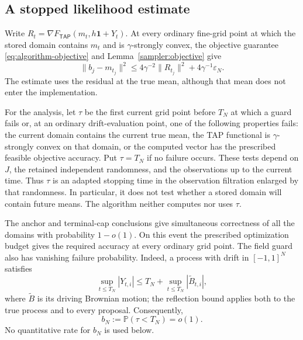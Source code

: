 \documentclass[11pt,reqno]{amsart}
\def\tap{{\mathsf{TAP}}}
\begin{document}
\subsection{A stopped likelihood estimate}

Write $R_t=\nabla F_{\tap}(m_t,h\mathbf1+Y_t)$. At every ordinary
fine-grid point at which the stored domain contains $m_t$ and is
$\gamma$-strongly convex, the objective guarantee
\eqref{eq:algorithm-objective} and Lemma~\ref{sampler:objective} give
\begin{equation}\label{eq:completion-drift-error}
 \|b_j-m_{t_j}\|^2
    \le4\gamma^{-2}\|R_{t_j}\|^2
                   +4\gamma^{-1}\varepsilon_N.
\end{equation}
The estimate uses the residual at the true mean, although that mean
does not enter the implementation.

For the analysis, let $\tau$ be the first current grid point before
$T_N$ at which a guard fails or, at an ordinary drift-evaluation point,
one of the following properties fails: the current domain contains the
current true mean, the TAP functional is $\gamma$-strongly convex on
that domain, or the computed vector has the prescribed feasible
objective accuracy. Put $\tau=T_N$ if no failure occurs. These tests
depend on $J$, the retained independent randomness, and the observations
up to the current time. Thus $\tau$ is an adapted stopping time in the
observation filtration enlarged by that randomness. In particular, it
does not test whether a stored domain will contain future means.
The algorithm neither computes nor uses $\tau$.

The anchor and terminal-cap conclusions give simultaneous correctness
of all the domains with probability $1-o(1)$. On this event the
prescribed optimization budget gives the required accuracy at every
ordinary grid point. The field guard also has vanishing failure
probability. Indeed, a process with drift in $[-1,1]^N$ satisfies
\[
 \sup_{t\le T_N}|Y_{t,i}|
 \le T_N+\sup_{t\le T_N}|\widetilde B_{t,i}|,
\]
where $\widetilde B$ is its driving Brownian motion; the reflection
bound applies both to the true process and to every proposal.
Consequently,
\begin{equation*}
 b_N:=\mathbb P(\tau<T_N)=o(1).
\end{equation*}
No quantitative rate for $b_N$ is used below.
\end{document}
